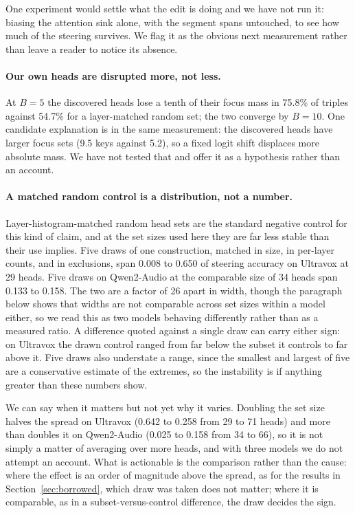 \documentclass[11pt]{article}
\begin{document}
One experiment would settle what the edit is doing and we have not run it:
biasing the attention sink alone, with the segment spans untouched, to see how
much of the steering survives. We flag it as the obvious next measurement rather
than leave a reader to notice its absence.

\paragraph{Our own heads are disrupted more, not less.}
At $B{=}5$ the discovered heads lose a tenth of their focus mass in 75.8\% of
triples against 54.7\% for a layer-matched random set; the two converge by
$B{=}10$. One candidate explanation is in the same measurement: the discovered
heads have larger focus sets (9.5 keys against 5.2), so a fixed logit shift
displaces more absolute mass. We have not tested that and offer it as a
hypothesis rather than an account.

\paragraph{A matched random control is a distribution, not a number.}
Layer-histogram-matched random head sets are the standard negative control for
this kind of claim, and at the set sizes used here they are far less stable than
their use implies. Five draws of one construction, matched in size, in per-layer
counts, and in exclusions, span 0.008 to 0.650 of steering accuracy on Ultravox
at 29 heads. Five draws on Qwen2-Audio at the comparable size of 34 heads span
0.133 to 0.158. The two are a factor of 26 apart in width, though the paragraph
below shows that widths are not comparable across set sizes within a model
either, so we read this as two models behaving differently rather than as a
measured ratio. A difference quoted against a single draw can carry either sign:
on Ultravox the drawn control ranged from far below the subset it controls to far
above it. Five draws also understate a range, since the smallest and largest of
five are a conservative estimate of the extremes, so the instability is if
anything greater than these numbers show.

We can say when it matters but not yet why it varies. Doubling the set size
halves the spread on Ultravox (0.642 to 0.258 from 29 to 71 heads) and more than
doubles it on Qwen2-Audio (0.025 to 0.158 from 34 to 66), so it is not simply a
matter of averaging over more heads, and with three models we do not attempt an
account. What is actionable is the comparison rather than the cause: where the
effect is an order of magnitude above the spread, as for the results in
Section~\ref{sec:borrowed}, which draw was taken does not matter; where it is
comparable, as in a subset-versus-control difference, the draw decides the sign.
\end{document}
